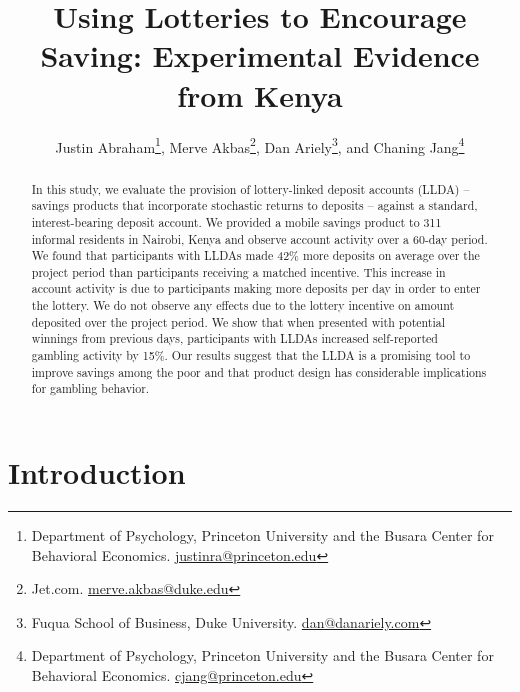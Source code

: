 \documentclass[12pt]{article}
\begin{document}
\title{Using Lotteries to Encourage Saving: Experimental Evidence from Kenya}

\author{Justin Abraham\thanks{Department of Psychology, Princeton University and the Busara Center for Behavioral Economics. \protect\href{mailto:justinra@princeton.edu}{justinra@princeton.edu}}, Merve Akbas\thanks{Jet.com. \protect\href{mailto:merve.akbas@duke.edu}{merve.akbas@duke.edu}}, Dan Ariely\thanks{Fuqua School of Business, Duke University. \protect\href{mailto:dan@danariely.com}{dan@danariely.com}}, and Chaning Jang\thanks{Department of Psychology, Princeton University and the Busara Center for Behavioral Economics. \protect\href{mailto:cjang@princeton.edu}{cjang@princeton.edu}}} %

\maketitle

\begin{abstract}

	In this study, we evaluate the provision of lottery-linked deposit accounts (LLDA) -- savings products that incorporate stochastic returns to deposits -- against a standard, interest-bearing deposit account. We provided a mobile savings product to 311 informal residents in Nairobi, Kenya and observe account activity over a 60-day period. We found that participants with LLDAs made 42\% more deposits on average over the project period than participants receiving a matched incentive. This increase in account activity is due to participants making more deposits per day in order to enter the lottery. We do not observe any effects due to the lottery incentive on amount deposited over the project period. We show that when presented with potential winnings from previous days, participants with LLDAs increased self-reported gambling activity by 15\%. Our results suggest that the LLDA is a promising tool to improve savings among the poor and that product design has considerable implications for gambling behavior.

\end{abstract}

\newpage

\section{Introduction}
\end{document}
